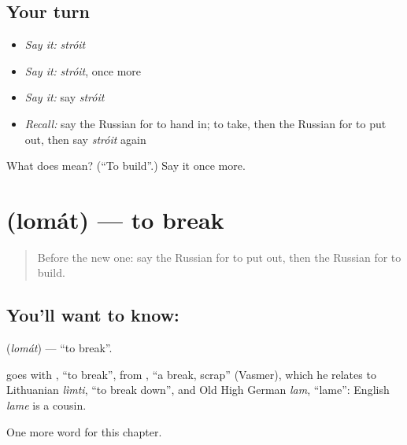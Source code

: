 \subsection*{Your turn}
\begin{itemize}
\raggedright
  \item \emph{Say it:} \emph{stróit}
  \item \emph{Say it:} \emph{stróit}, once more
  \item \emph{Say it:} say \emph{stróit}
  \item \emph{Recall:} say the Russian for to hand in; to take, then the Russian for to put out, then say \emph{stróit} again
\end{itemize}

\begin{tcolorbox}[breakable,colback=teal!4,colframe=teal!35!black,title={Before you move on}]
What does  mean? (\textquotedblleft{}To build\textquotedblright{}.) Say it once more.
\end{tcolorbox}
\section[\texorpdfstring{\ru{ломать} (lomát)}{ломать (lomát)}]{ (lomát) — to break}

\label{lesson:RU-C206-lomat}



\begin{quote}
Before the new one: say the Russian for to put out, then the Russian for to build.
\end{quote}

\subsection*{You'll want to know: }
\textbf{} (\emph{lomát}) — \textquotedblleft{}to break\textquotedblright{}.

\begin{cousinweb}
\textbf{} goes with \emph{}, \textquotedblleft{}to break\textquotedblright{}, from \emph{}, \textquotedblleft{}a break, scrap\textquotedblright{} (Vasmer), which he relates to Lithuanian \emph{lìmti}, \textquotedblleft{}to break down\textquotedblright{}, and Old High German \emph{lam}, \textquotedblleft{}lame\textquotedblright{}: English \emph{lame} is a cousin.
\end{cousinweb}

\begin{grammarlens}[title={What you've built}]
One more word for this chapter.
\end{grammarlens}

